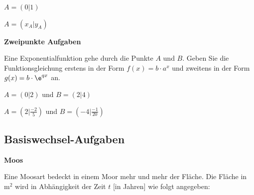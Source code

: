 \begin{bbwAufgabenBlock}



\item $A=(0|1)$



\item $A=(x_A|y_A)$

  
\end{bbwAufgabenBlock}


\platzFuerBerechnungenBisEndeSeite{}



\bbwActAufgabenNr{} \textbf{Zweipunkte Aufgaben}

Eine Exponentialfunktion gehe durch die Punkte $A$ und $B$. Geben Sie
die Funktionsgleichung erstens in der Form $f(x)=b\cdot{} a^x$ und
zweitens in der Form $g(x)=b\cdot{} \e^{qx}$ an.

\begin{bbwAufgabenBlock}
\item $A=(0|2)$ und $B=(2|4)$


\item $A=(2|\frac{-2}{5})$ und $B=(-4|\frac{-1}{20})$

\end{bbwAufgabenBlock}





\subsection{Basiswechsel-Aufgaben}


\bbwActAufgabenNr{} \textbf{Moos}

Eine Moosart bedeckt in einem Moor mehr und mehr der Fläche. Die
Fläche in $\text{m}^2$ wird in Abhängigkeit der Zeit $t$ [in Jahren]
wie folgt angegeben:

